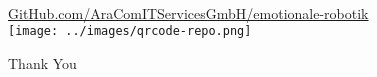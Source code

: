 \documentclass[aspectratio=169]{beamer}
\begin{document}
\begin{frame}[c]{}
  \centering
  \begin{minipage}{\textwidth}
    \centering
    \Large {}\\
    \href{https://github.com/wieerwill/emotional-robotics}{GitHub.com/AraComITServicesGmbH/emotionale-robotik}\\
    \vspace{.4cm}
    \texttt{[image: ../images/qrcode-repo.png]}
  \end{minipage}
\end{frame}

\begin{frame}[c]{}
  \centering
  \begin{minipage}{\textwidth}
    \centering
    \Huge Thank You\\
    \Large {}
  \end{minipage}
\end{frame}
\end{document}
